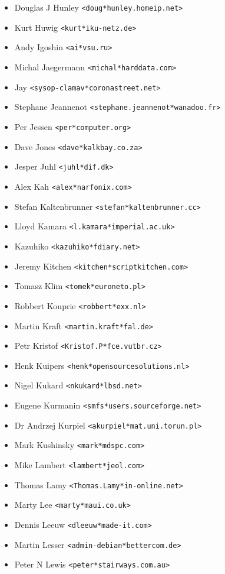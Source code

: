 \documentclass[a4paper,titlepage,12pt]{article}
\newcommand{\email}[1]{\texttt{#1}}
\begin{document}
\begin{itemize}
	\item Douglas J Hunley \email{<doug*hunley.homeip.net>}
	\item Kurt Huwig \email{<kurt*iku-netz.de>}
	\item Andy Igoshin \email{<ai*vsu.ru>}
	\item Michal Jaegermann \email{<michal*harddata.com>}
	\item Jay \email{<sysop-clamav*coronastreet.net>}
	\item Stephane Jeannenot \email{<stephane.jeannenot*wanadoo.fr>}
	\item Per Jessen \email{<per*computer.org>}
	\item Dave Jones \email{<dave*kalkbay.co.za>}
	\item Jesper Juhl \email{<juhl*dif.dk>}
	\item Alex Kah \email{<alex*narfonix.com>}
	\item Stefan Kaltenbrunner \email{<stefan*kaltenbrunner.cc>}
	\item Lloyd Kamara \email{<l.kamara*imperial.ac.uk>}
	\item Kazuhiko \email{<kazuhiko*fdiary.net>}
	\item Jeremy Kitchen \email{<kitchen*scriptkitchen.com>}
	\item Tomasz Klim \email{<tomek*euroneto.pl>}
	\item Robbert Kouprie \email{<robbert*exx.nl>}
	\item Martin Kraft \email{<martin.kraft*fal.de>}
	\item Petr Kristof \email{<Kristof.P*fce.vutbr.cz>}
	\item Henk Kuipers \email{<henk*opensourcesolutions.nl>}
	\item Nigel Kukard \email{<nkukard*lbsd.net>}
	\item Eugene Kurmanin \email{<smfs*users.sourceforge.net>}
	\item Dr Andrzej Kurpiel \email{<akurpiel*mat.uni.torun.pl>}
	\item Mark Kushinsky \email{<mark*mdspc.com>}
	\item Mike Lambert \email{<lambert*jeol.com>}
	\item Thomas Lamy \email{<Thomas.Lamy*in-online.net>}
	\item Marty Lee \email{<marty*maui.co.uk>}
	\item Dennis Leeuw \email{<dleeuw*made-it.com>}
	\item Martin Lesser \email{<admin-debian*bettercom.de>}
	\item Peter N Lewis \email{<peter*stairways.com.au>}

\end{itemize}
\end{document}

